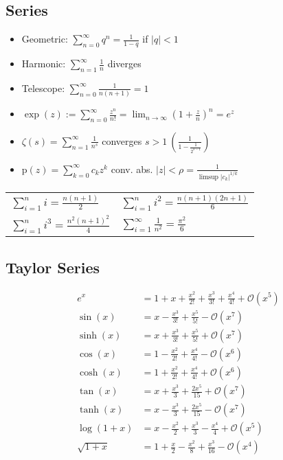 \documentclass[a4paper, 10pt]{article}
\theoremstyle{definition}
\theoremstyle{ex}
\theoremstyle{named}
\newcommand{\BO}{\mathcal{O}}
\begin{document}
\subsection*{Series}
\begin{itemize}
    \item Geometric: $\sum_{n = 0}^\infty q^n = \frac{1}{1 - q}$ if $|q| < 1$
    \item Harmonic: $\sum_{n = 1}^\infty \frac{1}{n}$ diverges
    \item Telescope: $\sum_{n = 0}^\infty \frac{1}{n(n + 1)} = 1$
    \item $\exp(z) := \sum_{n = 0}^\infty \frac{z^n}{n!} = \lim_{n\to\infty}(1 + \frac{z}{n})^n = e^z$
    \item $\zeta(s) = \sum_{n=1}^\infty \frac{1}{n^s}$ converges $s > 1 \ (\frac{1}{1 - \frac{1}{2^{s-1}}})$
    \item $\text{p}(z) = \sum_{k = 0}^\infty c_kz^k$ conv. abs. $|z| < \rho = \frac{1}{\limsup |c_k|^{1/k}}$
\end{itemize}
\begin{tabularx}{\linewidth}{XX}
    \toprule
    $\sum\limits_{i=1}^n i = \frac{n(n+1)}{2}$ & $\sum\limits_{i=1}^n i^2 = \frac{n(n+1)(2n + 1)}{6}$ \\
    $\sum\limits_{i=1}^n i^3 = \frac{n^2(n+1)^2}{4}$ & $\sum\limits_{i=1}^\infty \frac{1}{n^2} = \frac{\pi^2}{6}$ \\
    \bottomrule
\end{tabularx}

\subsection*{Taylor Series}
\begin{align*}
    e^x &= 1 + x + \frac{x^2}{2!} + \frac{x^3}{3!} + \frac{x^4}{4!} + \BO(x^5) \\
    \sin(x) &= x - \frac{x^3}{3!} + \frac{x^5}{5!} - \BO(x^7) \\
    \sinh(x) &= x + \frac{x^3}{3!} + \frac{x^5}{5!} + \BO(x^7) \\
    \cos(x) &= 1 - \frac{x^2}{2!} + \frac{x^4}{4!} - \BO(x^6) \\
    \cosh(x) &= 1 + \frac{x^2}{2!} + \frac{x^4}{4!} + \BO(x^6) \\
    \tan(x) &= x + \frac{x^3}{3} + \frac{2x^5}{15} + \BO(x^7) \\
    \tanh(x) &= x - \frac{x^3}{3} + \frac{2x^5}{15} - \BO(x^7) \\
    \log(1+x) &= x - \frac{x^2}{2} + \frac{x^3}{3} - \frac{x^4}{4} + \BO(x^5) \\
    \sqrt{1 + x} &= 1 + \frac{x}{2} - \frac{x^2}{8} + \frac{x^3}{16} - \BO(x^4)
\end{align*}
\end{document}
